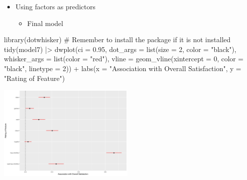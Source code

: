 \documentclass[
  ignorenonframetext,
]{beamer}
\newenvironment{Shaded}{\begin{snugshade}}{\end{snugshade}}
\newcommand{\AttributeTok}[1]{\textcolor[rgb]{0.40,0.45,0.13}{#1}}
\newcommand{\CommentTok}[1]{\textcolor[rgb]{0.37,0.37,0.37}{#1}}
\newcommand{\DecValTok}[1]{\textcolor[rgb]{0.68,0.00,0.00}{#1}}
\newcommand{\FloatTok}[1]{\textcolor[rgb]{0.68,0.00,0.00}{#1}}
\newcommand{\FunctionTok}[1]{\textcolor[rgb]{0.28,0.35,0.67}{#1}}
\newcommand{\NormalTok}[1]{\textcolor[rgb]{0.00,0.23,0.31}{#1}}
\newcommand{\SpecialCharTok}[1]{\textcolor[rgb]{0.37,0.37,0.37}{#1}}
\newcommand{\StringTok}[1]{\textcolor[rgb]{0.13,0.47,0.30}{#1}}
\providecommand{\tightlist}{%
  \setlength{\itemsep}{0pt}\setlength{\parskip}{0pt}}\usepackage{longtable,booktabs,array}
\begin{document}
\begin{frame}[fragile]{}
\label{section-41}
\begin{itemize}
\item
  Using factors as predictors

  \begin{itemize}
  \tightlist
  \item
    Final model
  \end{itemize}
\end{itemize}

\tiny

\begin{Shaded}
\begin{Highlighting}[]
\FunctionTok{library}\NormalTok{(dotwhisker)  }\CommentTok{\# Remember to install the package if it is not installed}
\FunctionTok{tidy}\NormalTok{(model7) }\SpecialCharTok{|\textgreater{}} 
  \FunctionTok{dwplot}\NormalTok{(}\AttributeTok{ci =} \FloatTok{0.95}\NormalTok{,}
         \AttributeTok{dot\_args =} \FunctionTok{list}\NormalTok{(}\AttributeTok{size =} \DecValTok{2}\NormalTok{, }\AttributeTok{color =} \StringTok{"black"}\NormalTok{), }\AttributeTok{whisker\_args =} \FunctionTok{list}\NormalTok{(}\AttributeTok{color =} \StringTok{"red"}\NormalTok{),}
         \AttributeTok{vline =} \FunctionTok{geom\_vline}\NormalTok{(}\AttributeTok{xintercept =} \DecValTok{0}\NormalTok{, }\AttributeTok{color =} \StringTok{"black"}\NormalTok{, }\AttributeTok{linetype =} \DecValTok{2}\NormalTok{)) }\SpecialCharTok{+} 
  \FunctionTok{labs}\NormalTok{(}\AttributeTok{x =} \StringTok{"Association with Overall Satisfaction"}\NormalTok{, }\AttributeTok{y =} \StringTok{"Rating of Feature"}\NormalTok{)}
\end{Highlighting}
\end{Shaded}

\begin{center}
\includegraphics[width=0.5\textwidth,height=\textheight]{007_identifying_drivers_of_outcomes_linear_models_files/figure-beamer/unnamed-chunk-43-1.pdf}
\end{center}
\end{frame}
\end{document}
